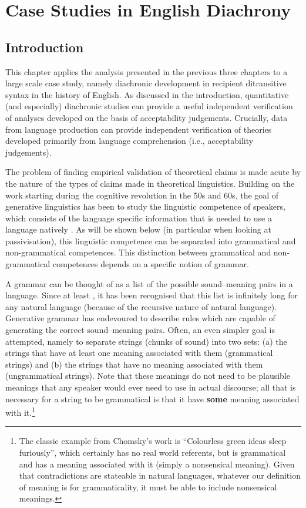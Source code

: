 \chapter{Case Studies in English Diachrony}\label{ch:diachron}
\section{Introduction}
This chapter applies the analysis presented in the previous three chapters to a large scale case study, namely diachronic development in recipient ditransitive syntax in the history of English. As discussed in the introduction, quantitative (and especially) diachronic studies can provide a useful independent verification of analyses developed on the basis of acceptability judgements. Crucially, data from language production can provide independent verification of theories developed primarily from language comprehension (i.e., acceptability judgements).

The problem of finding empirical validation of theoretical claims is made acute by the nature of the types of claims made in theoretical linguistics. Building on the work starting during the cognitive revolution in the 50s and 60s, the goal of generative linguistics has been to study the linguistic competence of speakers, which consists of the language specific information that is needed to use a language natively \citep{Chomsky.1981,Chomsky.1986}. As will be shown below (in particular when looking at passivisation), this linguistic competence can be separated into grammatical and non-grammatical competences. This distinction between grammatical and non-grammatical competences depends on a specific notion of grammar.

A grammar can be thought of as a list of the possible sound--meaning pairs in a language. Since at least \cite{Chomsky.1965}, it has been recognised that this list is infinitely long for any natural language (because of the recursive nature of natural language). Generative grammar has endevoured to describe rules which are capable of generating the correct sound--meaning pairs. Often, an even simpler goal is attempted, namely to separate strings (chunks of sound) into two sets: (a) the strings that have at least one meaning associated with them (grammatical strings) and (b) the strings that have no meaning associated with them (ungrammatical strings). Note that these meanings do not need to be plausible meanings that any speaker would ever need to use in actual discourse; all that is necessary for a string to be grammatical is that it have \textbf{some} meaning associated with it.\footnote{The classic example from Chomsky's work is ``Colourless green ideas sleep furiously'', which certainly has no real world referents, but is grammatical and has a meaning associated with it (simply a nonsensical meaning). Given that contradictions are stateable in natural languages, whatever our definition of meaning is for grammaticality, it must be able to include nonsensical meanings.}

